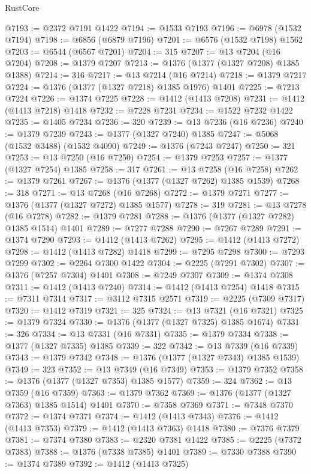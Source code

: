 \begin{lexlean}{RustCore}
\begin{coremodule}
@7193 := @2372 @7191 @1422
@7194 := @1533 @7193
@7196 := @6978 (@1532 @7194)
@7198 := @6856 (@6879 @7196)
@7201 := @6576 (@1532 @7198) @1562
@7203 := @6544 (@6567 @7201)
@7204 := 315
@7207 := @13 @7204 (@16 @7204)
@7208 := @1379 @7207
@7213 := @1376 (@1377 (@1327 @7208) @1385 @1388)
@7214 := 316
@7217 := @13 @7214 (@16 @7214)
@7218 := @1379 @7217
@7224 := @1376 (@1377 (@1327 @7218) @1385 @1976) @1401
@7225 := @7213 @7224
@7226 := @1374 @7225
@7228 := @1412 (@1413 @7208)
@7231 := @1412 (@1413 @7218) @1418
@7232 := @7228 @7231
@7234 := @1522 @7232 @1422
@7235 := @1405 @7234
@7236 := 320
@7239 := @13 @7236 (@16 @7236)
@7240 := @1379 @7239
@7243 := @1377 (@1327 @7240) @1385
@7247 := @5068 (@1532 @3488) (@1532 @4090)
@7249 := @1376 (@7243 @7247)
@7250 := 321
@7253 := @13 @7250 (@16 @7250)
@7254 := @1379 @7253
@7257 := @1377 (@1327 @7254) @1385
@7258 := 317
@7261 := @13 @7258 (@16 @7258)
@7262 := @1379 @7261
@7267 := @1376 (@1377 (@1327 @7262) @1385 @1539)
@7268 := 318
@7271 := @13 @7268 (@16 @7268)
@7272 := @1379 @7271
@7277 := @1376 (@1377 (@1327 @7272) @1385 @1577)
@7278 := 319
@7281 := @13 @7278 (@16 @7278)
@7282 := @1379 @7281
@7288 := @1376 (@1377 (@1327 @7282) @1385 @1514) @1401
@7289 := @7277 @7288
@7290 := @7267 @7289
@7291 := @1374 @7290
@7293 := @1412 (@1413 @7262)
@7295 := @1412 (@1413 @7272)
@7298 := @1412 (@1413 @7282) @1418
@7299 := @7295 @7298
@7300 := @7293 @7299
@7302 := @2264 @7300 @1422
@7304 := @2225 (@7291 @7302)
@7307 := @1376 (@7257 @7304) @1401
@7308 := @7249 @7307
@7309 := @1374 @7308
@7311 := @1412 (@1413 @7240)
@7314 := @1412 (@1413 @7254) @1418
@7315 := @7311 @7314
@7317 := @3112 @7315 @2571
@7319 := @2225 (@7309 @7317)
@7320 := @1412 @7319
@7321 := 325
@7324 := @13 @7321 (@16 @7321)
@7325 := @1379 @7324
@7330 := @1376 (@1377 (@1327 @7325) @1385 @1674)
@7331 := 326
@7334 := @13 @7331 (@16 @7331)
@7335 := @1379 @7334
@7338 := @1377 (@1327 @7335) @1385
@7339 := 322
@7342 := @13 @7339 (@16 @7339)
@7343 := @1379 @7342
@7348 := @1376 (@1377 (@1327 @7343) @1385 @1539)
@7349 := 323
@7352 := @13 @7349 (@16 @7349)
@7353 := @1379 @7352
@7358 := @1376 (@1377 (@1327 @7353) @1385 @1577)
@7359 := 324
@7362 := @13 @7359 (@16 @7359)
@7363 := @1379 @7362
@7369 := @1376 (@1377 (@1327 @7363) @1385 @1514) @1401
@7370 := @7358 @7369
@7371 := @7348 @7370
@7372 := @1374 @7371
@7374 := @1412 (@1413 @7343)
@7376 := @1412 (@1413 @7353)
@7379 := @1412 (@1413 @7363) @1418
@7380 := @7376 @7379
@7381 := @7374 @7380
@7383 := @2320 @7381 @1422
@7385 := @2225 (@7372 @7383)
@7388 := @1376 (@7338 @7385) @1401
@7389 := @7330 @7388
@7390 := @1374 @7389
@7392 := @1412 (@1413 @7325)

\end{coremodule}
\end{lexlean}

